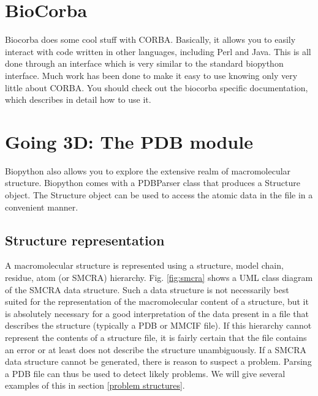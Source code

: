\documentclass{report}
\begin{document}
\section{BioCorba}

Biocorba does some cool stuff with CORBA. Basically, it allows you to easily interact with code written in other languages, including Perl and Java. This is all done through an interface which is very similar to the standard biopython interface. Much work has been done to make it easy to use knowing only very little about CORBA. You should check out the biocorba specific documentation, which describes in detail how to use it.

\section{Going 3D: The PDB module}

Biopython also allows you to explore the extensive realm of macromolecular structure. 
Biopython comes with a PDBParser class that produces a Structure object. The Structure object 
can be used to access the atomic data in the file in a convenient manner. 

\subsection{Structure representation}

A macromolecular structure is represented using a structure, model chain,
residue, atom (or SMCRA) hierarchy. Fig. \ref{fig:smcra} shows a UML
class diagram of the SMCRA data structure.  Such a data structure is not
necessarily best suited for the representation of the macromolecular content of
a structure, but it is absolutely necessary for a good interpretation of the
data present in a file that describes the structure (typically a PDB or MMCIF
file). If this hierarchy cannot represent the contents of a structure file, it
is fairly certain that the file contains an error or at least does not describe
the structure unambiguously. If a SMCRA data structure cannot be generated,
there is reason to suspect a problem. Parsing a PDB file can thus be used to
detect likely problems. We will give several examples of this in section
\ref{problem structures}. 

\begin{htmlonly}
\label{fig:smcra}
\end{htmlonly}
\end{document}

